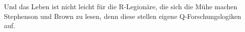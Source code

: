 Und das Leben ist nicht leicht für die R-Legionäre, die sich die Mühe machen Stephenson und Brown zu lesen, denn diese stellen eigene Q-Forschungslogiken auf.